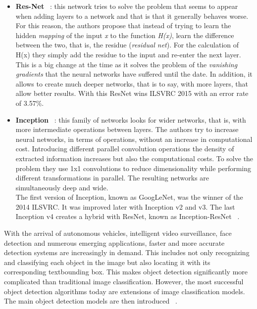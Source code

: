 \documentclass{bmvc2k}
\begin{document}
\begin{itemize}
\item \textbf{Res-Net} ~\cite{he2016deep}: this network tries to solve the problem that seems to appear when adding layers to a network and that is that it generally behaves worse. For this reason, the authors propose that instead of trying to learn the hidden \textit{mapping} of the input \textit{x} to the function \textit{H(x)}, learn the difference between the two, that is, the residue (\textit{residual net}). For the calculation of H(x) they simply add the residue to the input and re-enter the next layer. This is a big change at the time as it solves the problem of the \textit{vanishing gradients} that the neural networks have suffered until the date. In addition, it allows to create much deeper networks, that is to say, with more layers, that allow better results. With this ResNet wins ILSVRC 2015 with an error rate of 3.57\%. %
\item \textbf{Inception} ~\cite{szegedy2015going}: this family of networks looks for wider networks, that is, with more intermediate operations between layers. The authors try to increase neural networks, in terms of operations, without an increase in computational cost. Introducing different parallel convolution operations the density of extracted information increases but also the computational costs. To solve the problem they use 1x1 convolutions to reduce dimensionality while performing different transformations in parallel. The resulting networks are simultaneously deep and wide.\\
The first version of Inception, known as GoogLeNet, was the winner of the 2014 ILSVRC. It was improved later with Inception v2 and v3. The last Inception v4 creates a hybrid with ResNet, known as Inception-ResNet ~\cite{szegedy2017inception}.
\end{itemize}
With the arrival of autonomous vehicles, intelligent video surveillance, face detection and numerous emerging applications, faster and more accurate detection systems are increasingly in demand. This includes not only recognizing and classifying each object in the image but also locating it with its corresponding text{bounding box}. This makes object detection significantly more complicated than traditional image classification. However, the most successful object detection algorithms today are extensions of image classification models.\\
The main object detection models are then introduced ~\cite{fu2017dssd}.  %
\end{document}
